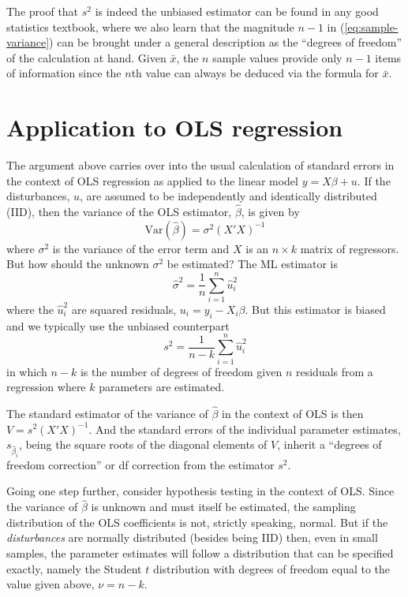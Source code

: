 The proof that $s^2$ is indeed the unbiased estimator can be found in
any good statistics textbook, where we also learn that the magnitude
$n-1$ in (\ref{eq:sample-variance}) can be brought under a general
description as the ``degrees of freedom'' of the calculation at
hand. Given $\bar{x}$, the $n$ sample values provide only $n-1$ items
of information since the $n$th value can always be deduced via the
formula for $\bar{x}$.

\section{Application to OLS regression}
\label{sec:df-ols}

The argument above carries over into the usual calculation of standard
errors in the context of OLS regression as applied to the linear model
$y = X\beta + u$.  If the disturbances, $u$, are assumed to be
independently and identically distributed (IID), then the variance of
the OLS estimator, $\hat\beta$, is given by
%
\[
\mbox{Var}\left(\hat\beta\right) = \sigma^2 (X'X)^{-1}
\]
%
where $\sigma^2$ is the variance of the error term and $X$ is an
$n\times k$ matrix of regressors.  But how should the unknown
$\sigma^2$ be estimated?  The ML estimator is
%
\begin{equation}
\label{eq:ols-sigma2}
\hat\sigma^2 = \frac{1}{n} \sum_{i=1}^n \hat{u}^2_i
\end{equation}
%
where the $\hat{u}^2_i$ are squared residuals, $u_i = y_i - X_i\beta$.
But this estimator is biased and we typically use the unbiased
counterpart
%
\begin{equation}
\label{eq:ols-s2}
s^2 = \frac{1}{n-k} \sum_{i=1}^n \hat{u}_i^2
\end{equation}
%
in which $n - k$ is the number of degrees of freedom given $n$
residuals from a regression where $k$ parameters are estimated.

The standard estimator of the variance of $\hat\beta$ in the
context of OLS is then $V = s^2 (X'X)^{-1}$.  And the standard errors
of the individual parameter estimates, $s_{\hat{\beta}_i}$, being the
square roots of the diagonal elements of $V$, inherit a ``degrees of
freedom correction'' or df correction from the estimator $s^2$.

Going one step further, consider hypothesis testing in the context of
OLS.  Since the variance of $\hat\beta$ is unknown and must itself be
estimated, the sampling distribution of the OLS coefficients is not,
strictly speaking, normal.  But if the \textit{disturbances} are
normally distributed (besides being IID) then, even in small samples,
the parameter estimates will follow a distribution that can be
specified exactly, namely the Student $t$ distribution with degrees
of freedom equal to the value given above, $\nu = n-k$.

